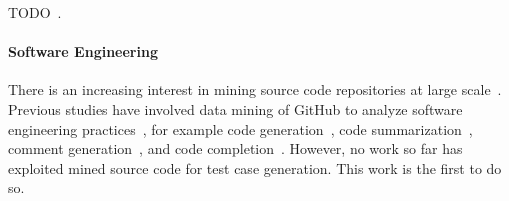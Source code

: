 TODO~\cite{White2016}.

\paragraph{Software Engineering} There is an increasing interest in mining source code repositories at large scale~\cite{Allamanis2013a,White2015a,Bird2009}. Previous studies have involved data mining of GitHub to analyze software engineering practices~\cite{Wu2014,Guzman2014,Baishakhi2014a,Vasilescu2015}, for example code generation~\cite{Zhang2015a}, code summarization~\cite{Allamanis2016}, comment generation~\cite{Wong2013}, and code completion~\cite{Raychev2014}. However, no work so far has exploited mined source code for test case generation. This work is the first to do so.